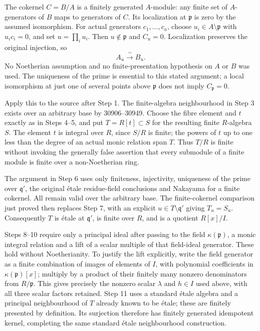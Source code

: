 The cokernel \(C=B/A\) is a finitely generated \(A\)-module: any finite set of \(A\)-generators of \(B\) maps to generators of \(C\). Its localization at \(\mathfrak p\) is zero by the assumed isomorphism. For actual generators \(c_1,\ldots,c_a\), choose \(u_i\in A\setminus\mathfrak p\) with \(u_ic_i=0\), and set \(u=\prod_i u_i\). Then \(u\notin\mathfrak p\) and \(C_u=0\). Localization preserves the original injection, so \[
A_u\xrightarrow{\;\sim\;}B_u.
\] No Noetherian assumption and no finite-presentation hypothesis on \(A\) or \(B\) was used. The uniqueness of the prime is essential to this stated argument; a local isomorphism at just one of several points above \(\mathfrak p\) does not imply \(C_{\mathfrak p}=0\).

Apply this to the source after Step 1. The finite-algebra neighbourhood in Step 3 exists over an arbitrary base by 30906--30949. Choose the fibre element and \(t\) exactly as in Steps 4--5, and put \(T=R[t]\subset S\) for the resulting finite \(R\)-algebra \(S\). The element \(t\) is integral over \(R\), since \(S/R\) is finite; the powers of \(t\) up to one less than the degree of an actual monic relation span \(T\). Thus \(T/R\) is finite without invoking the generally false assertion that every submodule of a finite module is finite over a non-Noetherian ring.

The argument in Step 6 uses only finiteness, injectivity, uniqueness of the prime over \(\mathfrak q'\), the original étale residue-field conclusions and Nakayama for a finite cokernel. All remain valid over the arbitrary base. The finite-cokernel comparison just proved then replaces Step 7, with an explicit \(u\in T\setminus\mathfrak q'\) giving \(T_u=S_u\). Consequently \(T\) is étale at \(\mathfrak q'\), is finite over \(R\), and is a quotient \(R[x]/I\).

Steps 8--10 require only a principal ideal after passing to the field \(\kappa(\mathfrak p)\), a monic integral relation and a lift of a scalar multiple of that field-ideal generator. These hold without Noetherianity. To justify the lift explicitly, write the field generator as a finite combination of images of elements of \(I\), with polynomial coefficients in \(\kappa(\mathfrak p)[x]\); multiply by a product of their finitely many nonzero denominators from \(R/\mathfrak p\). This gives precisely the nonzero scalar \(\lambda\) and \(h\in I\) used above, with all three scalar factors retained. Step 11 uses a standard étale algebra and a principal neighbourhood of \(T\) already known to be étale; these are finitely presented by definition. Its surjection therefore has finitely generated idempotent kernel, completing the same standard étale neighbourhood construction.

